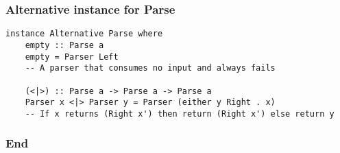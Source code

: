 \documentclass{beamer}
\begin{document}
\begin{frame}
  \frametitle{Alternative instance for Parse}

  \begin{lstlisting}[frame=single]
  instance Alternative Parse where
    empty :: Parse a
    empty = Parser Left
    -- A parser that consumes no input and always fails

    (<|>) :: Parse a -> Parse a -> Parse a
    Parser x <|> Parser y = Parser (either y Right . x)
    -- If x returns (Right x') then return (Right x') else return y
  \end{lstlisting}



\end{frame}



\begin{frame}
  \frametitle{End}
\end{frame}
\end{document}
